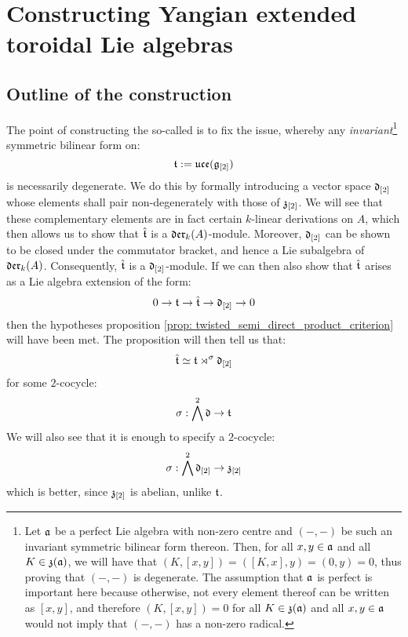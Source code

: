 \section{Constructing Yangian extended toroidal Lie algebras}

    \subsection{Outline of the construction}
        The point of constructing the so-called  is to fix the issue, whereby any \textit{invariant}\footnote{Let $\mathfrak{a}$ be a perfect Lie algebra with non-zero centre and $(-, -)$ be such an invariant symmetric bilinear form thereon. Then, for all $x, y \in \mathfrak{a}$ and all $K \in \mathfrak{z}(\mathfrak{a})$, we will have that $(K, [x, y]) = ([K, x], y) = (0, y) = 0$, thus proving that $(-, -)$ is degenerate. The assumption that $\mathfrak{a}$ is perfect is important here because otherwise, not every element thereof can be written as $[x, y]$, and therefore $(K, [x, y]) = 0$ for all $K \in \mathfrak{z}(\mathfrak{a})$ and all $x, y \in \mathfrak{a}$ would not imply that $(-, -)$ has a non-zero radical.} symmetric bilinear form on:
            $$\mathfrak{t}:= \mathfrak{uce}(\mathfrak{g}_{[2]})$$
        is necessarily degenerate. We do this by formally introducing a  vector space $\mathfrak{d}_{[2]}$ whose elements shall pair non-degenerately with those of $\mathfrak{z}_{[2]}$. We will see that these complementary elements are in fact certain $k$-linear derivations on $A$, which then allows us to show that $\hat{\mathfrak{t}}$ is a $\mathfrak{der}_k(A)$-module. Moreover, $\mathfrak{d}_{[2]}$ can be shown to be closed under the commutator bracket, and hence a Lie subalgebra of $\mathfrak{der}_k(A)$. Consequently, $\hat{\mathfrak{t}}$ is a $\mathfrak{d}_{[2]}$-module. If we can then also show that $\hat{\mathfrak{t}}$ arises as a Lie algebra extension of the form:
            $$0 \to \mathfrak{t} \to \hat{\mathfrak{t}} \to \mathfrak{d}_{[2]} \to 0$$
        then the hypotheses proposition \ref{prop: twisted_semi_direct_product_criterion} will have been met. The proposition will then tell us that:
            $$\hat{\mathfrak{t}} \simeq \mathfrak{t} \rtimes^{\sigma} \mathfrak{d}_{[2]}$$
        for some $2$-cocycle:
            $$\sigma: \bigwedge^2 \mathfrak{d} \to \mathfrak{t}$$
        We will also see that it is enough to specify a $2$-cocycle:
            $$\sigma: \bigwedge^2 \mathfrak{d}_{[2]} \to \mathfrak{z}_{[2]}$$
        which is better, since $\mathfrak{z}_{[2]}$ is abelian, unlike $\mathfrak{t}$.
        
